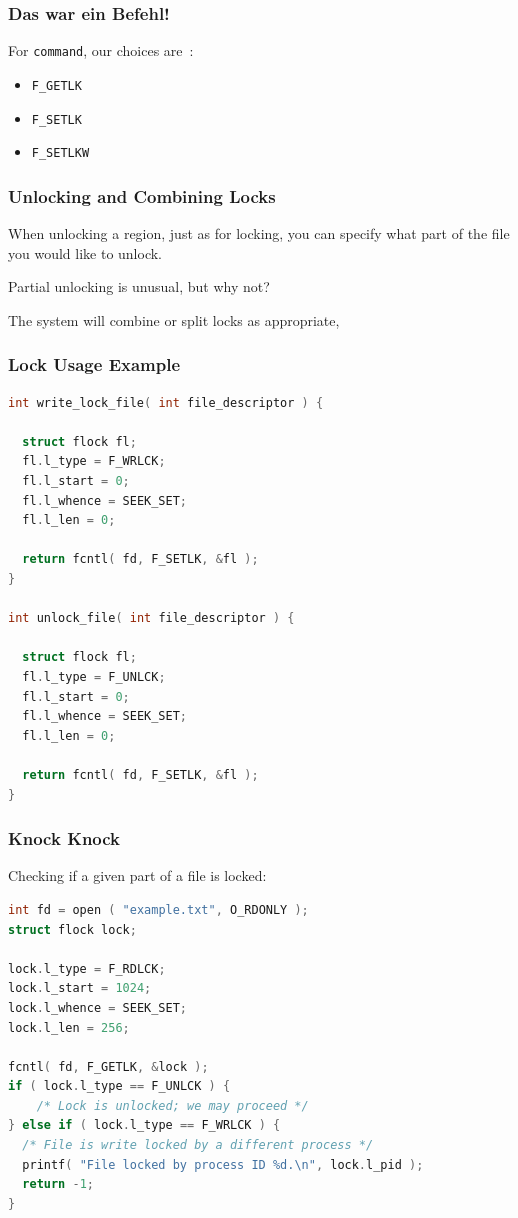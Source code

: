 \begin{frame}
	\frametitle{Das war ein Befehl!}

	For \texttt{command}, our choices are~\cite{apunix}:
	\begin{itemize}
		\item \texttt{F\_GETLK}
		\item \texttt{F\_SETLK}
		\item \texttt{F\_SETLKW}
	\end{itemize}

\end{frame}


\begin{frame}
	\frametitle{Unlocking and Combining Locks}

	When unlocking a region, just as for locking, you can specify what part of the file you would like to unlock.

	Partial unlocking is unusual, but why not?

	The system will combine or split locks as appropriate,


\end{frame}

\begin{frame}[fragile]
	\frametitle{Lock Usage Example}

	\begin{lstlisting}[language=C]
int write_lock_file( int file_descriptor ) {

  struct flock fl;
  fl.l_type = F_WRLCK;
  fl.l_start = 0;
  fl.l_whence = SEEK_SET;
  fl.l_len = 0;
  
  return fcntl( fd, F_SETLK, &fl );
}

int unlock_file( int file_descriptor ) {

  struct flock fl;
  fl.l_type = F_UNLCK;
  fl.l_start = 0;
  fl.l_whence = SEEK_SET;
  fl.l_len = 0;
  
  return fcntl( fd, F_SETLK, &fl );
}
\end{lstlisting}


\end{frame}

\begin{frame}[fragile]
	\frametitle{Knock Knock}

	Checking if a given part of a file is locked:


	\begin{lstlisting}[language=C]
int fd = open ( "example.txt", O_RDONLY );
struct flock lock;

lock.l_type = F_RDLCK;
lock.l_start = 1024;
lock.l_whence = SEEK_SET;
lock.l_len = 256;

fcntl( fd, F_GETLK, &lock );
if ( lock.l_type == F_UNLCK ) {
	/* Lock is unlocked; we may proceed */
} else if ( lock.l_type == F_WRLCK ) {
  /* File is write locked by a different process */
  printf( "File locked by process ID %d.\n", lock.l_pid );
  return -1;
}
\end{lstlisting}

\end{frame}

